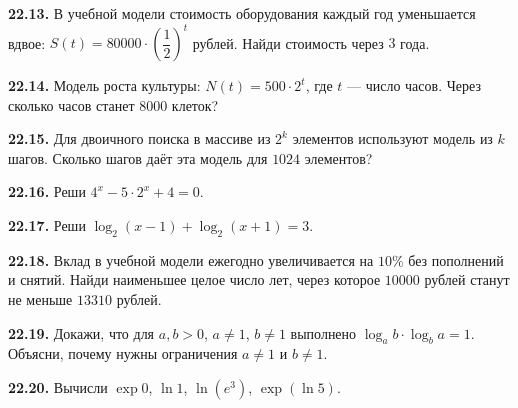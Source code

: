 \noindent\begin{minipage}[t]{\linewidth}\textbf{22.13.} В учебной модели стоимость оборудования каждый год уменьшается вдвое: \(S (t) = 80000 \cdot  (\dfrac{1}{2})^{t}\) рублей. Найди стоимость через \(3\) года.\par\end{minipage}\par
\noindent\begin{minipage}[t]{\linewidth}\textbf{22.14.} Модель роста культуры: \(N (t) = 500 \cdot  2^{t}\), где \(t\) — число часов. Через сколько часов станет \(8000\) клеток?\par\end{minipage}\par
\noindent\begin{minipage}[t]{\linewidth}\textbf{22.15.} Для двоичного поиска в массиве из \(2^{k}\) элементов используют модель из \(k\) шагов. Сколько шагов даёт эта модель для \(1024\) элементов?\par\end{minipage}\par
\noindent\begin{minipage}[t]{\linewidth}\textbf{22.16.}\starmark{} Реши \(4^{x} - 5 \cdot  2^{x} + 4 = 0\).\par\end{minipage}\par
\noindent\begin{minipage}[t]{\linewidth}\textbf{22.17.}\starmark{} Реши \(\log _{2} (x - 1) + \log _{2} (x + 1) = 3\).\par\end{minipage}\par
\noindent\begin{minipage}[t]{\linewidth}\textbf{22.18.}\starmark{} Вклад в учебной модели ежегодно увеличивается на \(10 \%\) без пополнений и снятий. Найди наименьшее целое число лет, через которое \(10000\) рублей станут не меньше \(13310\) рублей.\par\end{minipage}\par
\noindent\begin{minipage}[t]{\linewidth}\textbf{22.19.}\starmark{} Докажи, что для \(a,b>0\), \(a\ne1\), \(b\ne1\) выполнено \(\log_a b\cdot\log_b a=1\). Объясни, почему нужны ограничения \(a\ne1\) и \(b\ne1\).\par\end{minipage}\par
\noindent\begin{minipage}[t]{\linewidth}\textbf{22.20.} Вычисли \(\exp0\), \(\ln1\), \(\ln(e^3)\), \(\exp(\ln5)\).\par\end{minipage}\par
